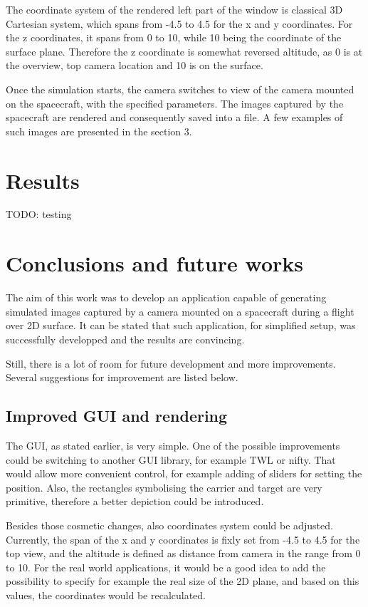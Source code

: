 \documentclass[english,12pt,a4paper,pdftex,elec,utf8]{aaltothesis}
\begin{document}
The coordinate system of the rendered left part of the window is classical 3D Cartesian system, which spans from -4.5 to 4.5 for the x and y coordinates. For the z coordinates, it spans from 0 to 10, while 10 being the coordinate of the surface plane. Therefore the z coordinate is somewhat reversed altitude, as 0 is at the overview, top camera location and 10 is on the surface. 

Once the simulation starts, the camera switches to view of the camera mounted on the spacecraft, with the specified parameters. The images captured by the spacecraft are rendered and consequently saved into a file. A few examples of such images are presented in the section 3.

\clearpage

\section{Results}

TODO: testing 

\clearpage

\section{Conclusions and future works} 

The aim of this work was to develop an application capable of generating simulated images captured by a camera mounted on a spacecraft during a flight over 2D surface. It can be stated that such application, for simplified setup, was successfully developped and the results are convincing.

Still, there is a lot of room for future development and more improvements. Several suggestions for improvement are listed below.


\subsection*{Improved GUI and rendering}

The GUI, as stated earlier, is very simple. One of the possible improvements could be switching to another GUI library, for example TWL\cite{TWL} or nifty\cite{Nifty}. That would allow more convenient control, for example adding of sliders for setting the position. Also, the rectangles symbolising the carrier and target are very primitive, therefore a better depiction could be introduced.

Besides those cosmetic changes, also coordinates system could be adjusted. Currently, the span of the x and y coordinates is fixly set from -4.5 to 4.5 for the top view, and the altitude is defined as distance from camera in the range from 0 to 10. For the real world applications, it would be a good idea to add the possibility to specify for example the real size of the 2D plane, and based on this values, the coordinates would be recalculated.
\end{document}
